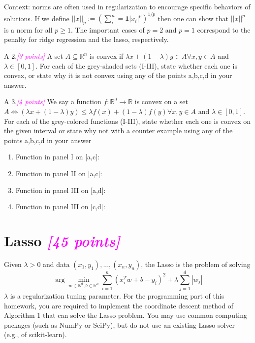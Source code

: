 \documentclass{article}
\newcommand{\argmin}{\arg\!\min}
\newcommand{\field}[1]{\mathbb{#1}}
\newcommand{\1}{\mathbf{1}}
\newcommand{\R}{\field{R}} %
\newcommand{\points}[1]{\small\textcolor{magenta}{\emph{[#1 points]}} \normalsize}
\begin{document}
Context: norms are often used in regularization to encourage specific behaviors of solutions. If we define $||x||_p:= (\sum^n_i = \1|x_i|^p)^{1/p}$ then one can show that $||x||^p$ is a norm for all $p\ge1$. The important cases of $p=2$ and $p=1$ correspond to the penalty for ridge regression and the lasso, respectively.



\newpage
A 2.\points{3} A set $A\subseteq \R^n$ is convex if $\lambda x + (1-\lambda)y \in A \forall x,y \in A$ and $\lambda\in [0,1]$. For each of the grey-shaded sets (I-III), state whether each one is convex, or state why it is not convex using any of the points a,b,c,d in your answer.




\newpage 
A 3.\points{4} We say a function $f:\R^d\rightarrow\R$ is convex on a set $A \iff (\lambda x + (1-\lambda)y)\leq \lambda f(x) + (1-\lambda)f(y) \forall x,y \in A$ and $\lambda\in [0,1]$. For each of the grey-colored functions (I-III), state whether each one is convex on the given interval or state why not with a counter example using any of the points a,b,c,d in your answer

\begin{enumerate}
    \item Function in panel I on [a,c]:
    \item Function in panel II on [a,c]:
    \item Function in panel III on [a,d]:
    \item Function in panel III on [c,d]:
\end{enumerate}{}




\newpage 
\section*{Lasso \points{45}}
Given $\lambda > 0$ and data $(x_1,y_1),...,(x_n,y_n)$, the Lasso is the problem of solving 
$$\argmin_{w\in\R^d,b\in\R^n} \sum_{i=1}^n (x^T_i w + b - y_i)^2 + \lambda\sum^d_{j=1}|w_j|$$
$\lambda$ is a regularization tuning parameter. For the programming part of this homework, you are required to implement the coordinate descent method of Algorithm 1 that can solve the Lasso problem. You may use common computing packages (such as NumPy or SciPy), but do not use an existing Lasso solver (e.g., of scikit-learn). 
\end{document}
